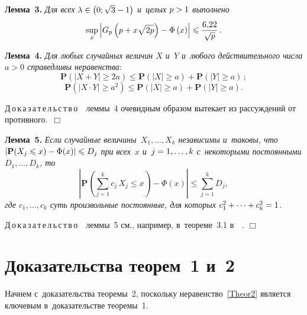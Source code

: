 \begin{multicols}{2}
\smallskip

\noindent
\textbf{Лемма~3.}
\textit{Для всех $\lambda\hm\in\left(0; \sqrt{3}-1\right)$ и~целых $p\hm>1$ выполнено}
    $$
    \sup\limits_{x}{\left|G_{p}\left(p+x\sqrt{2p}\right)-
\Phi\left(x\right)\right|}\leqslant \displaystyle\frac{\displaystyle 6{,}22\mathstrut}{\displaystyle \sqrt{p}\mathstrut}\,.
    $$

\smallskip

\noindent
\textbf{Лемма~4.}
\textit{Для любых случайных величин $X$ и~$Y$ и~любого действительного числа $a > 
0$ справедливы неравенства}:
    \begin{equation*}
    \mathbf{P}(|X+Y|\geq 2a) \leqslant \mathbf{P}(|X|\geq a)  + 
\mathbf{P}(|Y|\geq a)\,;
    \end{equation*}
          \begin{equation*}
    \mathbf{P}(|X\cdot Y|\geq a^2) \leqslant \mathbf{P}(|X|\geq a)  + 
\mathbf{P}(|Y|\geq a).
    \end{equation*}

\noindent
Д\,о\,к\,а\,з\,а\,т\,е\,л\,ь\,с\,т\,в\,о\ \ леммы~4 очевидным образом вытекает из рассуждений 
от противного.~\hfill $\Box$

\smallskip

\noindent
\textbf{Лемма~5.}
\textit{Если случайные величины~$X_1, \dots , X_k$ независимы и~таковы, что   $|\mathbf{P}(X_j 
\hm\leqslant x) \hm- \Phi (x)| \hm\leqslant D_j$ при всех~$x$ и~$j \hm= 1, \dots , k$
 с~некоторыми постоянными   $D_1, \dots , D_k$, то}
  \begin{equation*}
  \left| \mathbf{P}\left(\sum\limits_{j=1}^{k}c_j\,X_j \leqslant x\right) - \Phi (x)\right| \leqslant 
\sum\limits_{j=1}^{k} D_j,
  \end{equation*}
\textit{где $c_1,\dots , c_k $ суть произвольные постоянные, для которых}   $c_1^2 + 
\dots + c_k^2 \hm= 1$.

\noindent
Д\,о\,к\,а\,з\,а\,т\,е\,л\,ь\,с\,т\,в\,о\ \ леммы~5 см., например, в~теореме~3.1 
в~~\cite{lit:Letters_2006}. \hfill $\Box$



\section{Доказательства теорем~1 и~2}
\label{sec:proofs}


Начнем с~доказательства теоремы~2, поскольку неравенство~\eqref{Theor2} 
является ключевым в~доказательстве 
теоремы~1.


\end{multicols}
